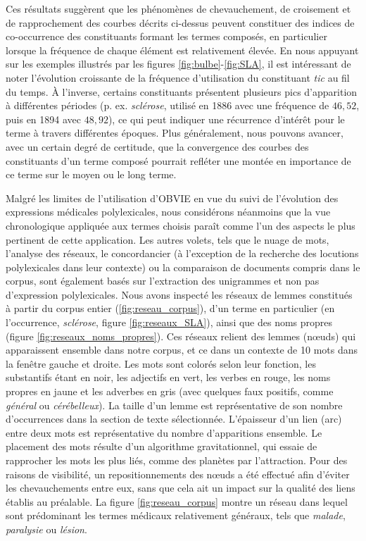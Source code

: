 Ces résultats suggèrent que les phénomènes de chevauchement, de croisement et de rapprochement des courbes décrits ci-dessus peuvent constituer des indices de co-occurrence des constituants formant les termes composés, en particulier lorsque la fréquence de chaque élément est relativement élevée. En nous appuyant sur les exemples illustrés par les figures \ref{fig:bulbe}-\ref{fig:SLA}, il est intéressant de noter l'évolution croissante de la fréquence d'utilisation du constituant \textit{tic} au fil du temps. À l'inverse, certains constituants présentent plusieurs \og{}pics\fg{} d'apparition à différentes périodes (p. ex. \textit{sclérose}, utilisé en 1886 avec une fréquence de $46,52$, puis en 1894 avec $48,92$), ce qui peut indiquer une récurrence d'intérêt pour le terme à travers différentes époques. Plus généralement, nous pouvons avancer, avec un certain degré de certitude, que la convergence des courbes des constituants d'un terme composé pourrait refléter une montée en importance de ce terme sur le moyen ou le long terme. 

Malgré les limites de l'utilisation d'\textsc{OBVIE} en vue du suivi de l'évolution des expressions médicales polylexicales, nous considérons néanmoins que la vue chronologique appliquée aux termes choisis paraît comme l'un des aspects le plus pertinent de cette application. Les autres volets, tels que le nuage de mots, l'analyse des réseaux, le concordancier (à l'exception de la recherche des locutions polylexicales dans leur contexte) ou la comparaison de documents compris dans le corpus, sont également basés sur l'extraction des unigrammes et non pas d'expression polylexicales. Nous avons inspecté les réseaux de lemmes constitués à partir du corpus entier (\ref{fig:reseau_corpus}), d'un terme en particulier (en l'occurrence, \textit{sclérose}, figure \ref{fig:reseaux_SLA}), ainsi que des noms propres (figure \ref{fig:reseaux_noms_propres}). Ces réseaux relient des lemmes (n\oe{}uds) qui apparaissent ensemble dans notre corpus, et ce dans un contexte de 10 mots dans la fenêtre gauche et droite. Les mots sont colorés selon leur fonction, les substantifs étant en noir, les adjectifs en vert, les verbes en rouge, les noms propres en jaune et les adverbes en gris (avec quelques faux positifs, comme \textit{général} ou \textit{cérébelleux}). La taille d'un lemme est représentative de son nombre d'occurrences dans la section de texte sélectionnée. L'épaisseur d'un lien (arc) entre deux mots est représentative du nombre d’apparitions ensemble. Le placement des mots résulte d'un algorithme gravitationnel, qui essaie de rapprocher les mots les plus liés, comme des planètes par l'attraction. Pour des raisons de visibilité, un repositionnements des n\oe{}uds a été effectué afin d'éviter les chevauchements entre eux, sans que cela ait un impact sur la qualité des liens établis au préalable. La figure \ref{fig:reseau_corpus} montre un réseau dans lequel sont prédominant les termes médicaux relativement généraux, tels que \textit{malade}, \textit{paralysie} ou \textit{lésion}. 

